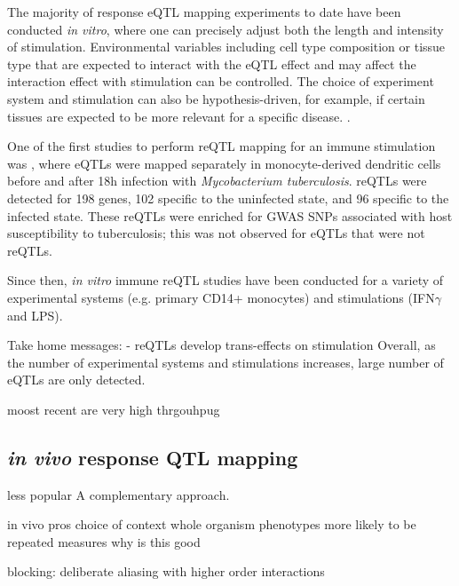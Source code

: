 \begin{outline}
The majority of response eQTL mapping experiments to date have been conducted \textit{in vitro}, where one can precisely adjust both the length and intensity of stimulation.
Environmental variables including cell type composition or tissue type that are expected to interact with the eQTL effect and may affect the interaction effect with stimulation can be controlled.
The choice of experiment system and stimulation can also be hypothesis-driven, for example, if certain tissues are expected to be more relevant for a specific disease. 
.

One of the first studies to perform \gls{reQTL} mapping for an immune stimulation was \autocite{barreiro2012DecipheringGeneticArchitecture}, where eQTLs were mapped separately in monocyte-derived dendritic cells before and after 18h infection with \textit{Mycobacterium tuberculosis}.
reQTLs were detected for 198 genes, 102 specific to the uninfected state, and 96 specific to the infected state. 
These reQTLs were enriched for GWAS SNPs associated with host susceptibility to tuberculosis; this was not observed for eQTLs that were not reQTLs.


Since then, \textit{in vitro} immune reQTL studies have been conducted for a variety of experimental systems (e.g. primary CD14+ monocytes\autocite{fairfax2014InnateImmuneActivity}) and stimulations (IFN$\gamma$ and LPS\autocite{fairfax2014GeneticsGeneExpression}).

Take home messages:
- reQTLs develop trans-effects on stimulation \autocite{fairfax2014InnateImmuneActivity}
Overall, as the number of experimental systems and stimulations increases, large number of eQTLs are only detected.

moost recent are very high thrgouhpug

\subsection{\textit{in vivo} response QTL mapping}

less popular
A complementary approach.

in vivo pros
    choice of context 
    whole organism phenotypes
    more likely to be repeated measures
        why is this good

        blocking: deliberate aliasing with higher order interactions


\end{outline}
